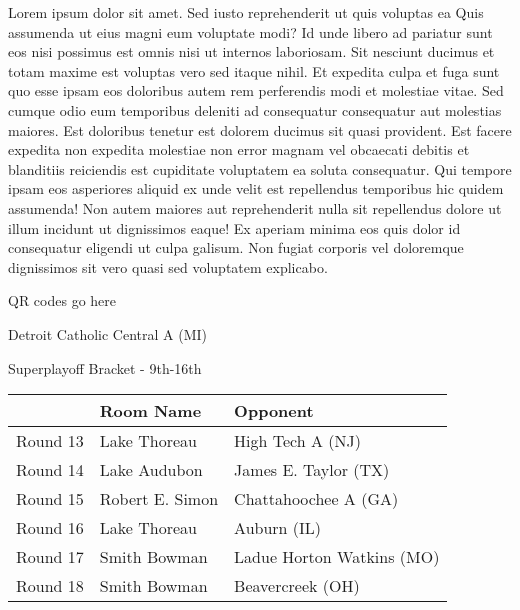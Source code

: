 \documentclass{article}%
\begin{document}
\vspace*{8pt}%
\linebreak%
\newline%
\newline%
Lorem ipsum dolor sit amet. Sed iusto reprehenderit ut quis voluptas ea Quis assumenda ut eius magni eum voluptate modi? Id unde libero ad pariatur sunt eos nisi possimus est omnis nisi ut internos laboriosam. Sit nesciunt ducimus et totam maxime est voluptas vero sed itaque nihil. Et expedita culpa et fuga sunt quo esse ipsam eos doloribus autem rem perferendis modi et molestiae vitae.\newline%
\newline%
Sed cumque odio eum temporibus deleniti ad consequatur consequatur aut molestias maiores. Est doloribus tenetur est dolorem ducimus sit quasi provident. Est facere expedita non expedita molestiae non error magnam vel obcaecati debitis et blanditiis reiciendis est cupiditate voluptatem ea soluta consequatur. Qui tempore ipsam eos asperiores aliquid ex unde velit est repellendus temporibus hic quidem assumenda!\newline%
\newline%
Non autem maiores aut reprehenderit nulla sit repellendus dolore ut illum incidunt ut dignissimos eaque! Ex aperiam minima eos quis dolor id consequatur eligendi ut culpa galisum. Non fugiat corporis vel doloremque dignissimos sit vero quasi sed voluptatem explicabo.\newline%
\newline%
%
\vspace*{30pt}%
\begin{center}%
\begin{Huge}%
QR codes go here%
\end{Huge}%
\end{center}%
\newpage%
\begin{center}%
\begin{Huge}%
Detroit Catholic Central A (MI)%
\end{Huge}%
\vspace*{8pt}%
\linebreak%
\begin{Large}%
Superplayoff Bracket {-} 9th{-}16th%
\end{Large}%
\end{center}%
%
\begin{tabularx}{\textwidth}{|c|Y|Y|}%
\hline%
&Room Name&Opponent\\%
\hline%
Round 13&Lake Thoreau&High Tech A (NJ)\\%
Round 14&Lake Audubon&James E. Taylor (TX)\\%
Round 15&Robert E. Simon&Chattahoochee A (GA)\\%
Round 16&Lake Thoreau&Auburn (IL)\\%
Round 17&Smith Bowman&Ladue Horton Watkins (MO)\\%
Round 18&Smith Bowman&Beavercreek (OH)\\%
\hline%
\end{tabularx}%
\end{document}
